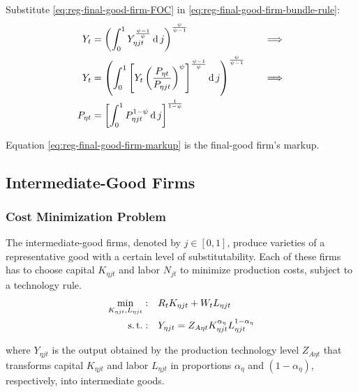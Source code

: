 \documentclass[
	thesis.tex
	]{subfiles}
\begin{document}
Substitute \ref{eq:reg-final-good-firm-FOC} in \ref{eq:reg-final-good-firm-bundle-rule}:
\begin{alignat}{2}
	Y_t & = \left( \int_{0}^{1} Y_{\eta jt}^{\frac{\psi-1}{\psi}} \operatorname{d} j \right)^{\frac{\psi}{\psi-1}} &\implies \nonumber \\
	Y_t & = \left( \int_{0}^{1} \left[ Y_t \left( \frac{P_{\eta t}}{P_{\eta jt}} \right)^{\psi} \right]^{\frac{\psi-1}{\psi}} \operatorname{d} j \right)^{\frac{\psi}{\psi-1}} \quad &\implies \nonumber \\
	P_{\eta t} & = \left[ \int_{0}^{1} P_{\eta jt}^{1-\psi} \operatorname{d} j \right]^{\frac{1}{1-\psi}} \label{eq:reg-final-good-firm-markup}
\end{alignat}

Equation \ref{eq:reg-final-good-firm-markup} is the final-good firm's markup.


\subsection{Intermediate-Good Firms}

\subsubsection*{Cost Minimization Problem}

The intermediate-good firms, denoted by $j \in [0,1]$, produce varieties of a representative good with a certain level of substitutability. Each of these firms has to choose capital $K_{\eta jt}$ and labor $N_{jt}$ to minimize production costs, subject to a technology rule.
\begin{align}
	\label{eq:reg-int-good-firm-total-cost}
	\min_{K_{\eta jt}, L_{\eta jt}}: \quad & R_t K_{\eta jt} + W_t L_{\eta jt} \\
	\label{eq:reg-int-good-firm-production-function}
	\operatorname{s.t.}: \quad & Y_{\eta jt} = Z_{A\eta t} K_{\eta jt}^{\alpha_\eta} L_{\eta jt}^{1-{\alpha_\eta}}
\end{align}

where $Y_{\eta jt}$ is the output obtained by the production technology level $Z_{A\eta t}$\footnotemark{} that transforms capital $K_{\eta jt}$ and labor $L_{\eta jt}$ in proportions ${\alpha_\eta}$ and $(1-{\alpha_\eta})$, respectively, into intermediate goods.

\end{document}
